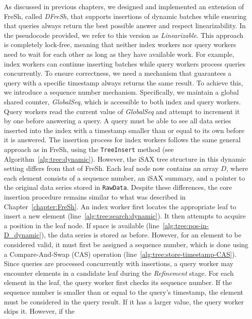 \documentclass[a4paper,11pt,twoside,openany]{book}
\begin{document}
As discussed in previous chapters, we designed and implemented an extension of FreSh,
called \textit{DFreSh}, that supports insertions of dynamic batches while ensuring that
queries always return the best possible answer and respect linearizability.
In the pseudocode provided, we refer to this version as \textit{Linearizable}.
This approach is completely lock-free, meaning that neither index workers nor query workers
need to wait for each other as long as they have available work. For example, index workers
can continue inserting batches while query workers process queries concurrently.  
% 
To ensure correctness, we need a mechanism that guarantees a query with a
specific timestamp always returns the same result. To achieve this, we introduce 
a sequence number mechanism. Specifically, we maintain a global shared counter,
\textit{GlobalSeq}, which is accessible to both index and query workers.
Query workers read the current value of \textit{GlobalSeq} and attempt to increment it
by one before answering a query. A query must be able to see all data series inserted
into the index with a timestamp smaller than or equal to its own before it is answered.  
%
The insertion process for index workers follows the same general approach as in FreSh,
using the \texttt{TreeInsert} method (see Algorithm~\ref{alg:tree:dynamic}). However,
the iSAX tree structure in this dynamic setting differs from that of FreSh.
Each leaf node now contains an array \( D \), where each element consists of
a sequence number, an iSAX summary, and a pointer to the original data series stored in
\texttt{RawData}. Despite these differences, the core insertion procedure remains
similar to what was described in Chapter~\ref{chapter:FreSh}.  
An index worker first locates the appropriate leaf to insert a new element
(line~\ref{alg:tree:search:dynamic}). It then attempts to acquire a position in the leaf
node. If space is available (line~\ref{alg:tree:pos-in-D_dynamic}), the data series is
stored as before. However, for an element to be considered valid, it must first be assigned
a sequence number, which is done using a Compare-And-Swap (CAS) operation
(line~\ref{alg:tree:store-timestamp-CAS}).  
Since queries are processed concurrently with insertions, a query worker may
encounter elements in a candidate leaf during the \textit{Refinement} stage. For each
element in the leaf, the query worker first checks its sequence number. If the sequence
number is smaller than or equal to the query's timestamp, the element must be considered
in the query result. If it has a larger value, the query worker skips it. However, if the
\end{document}
